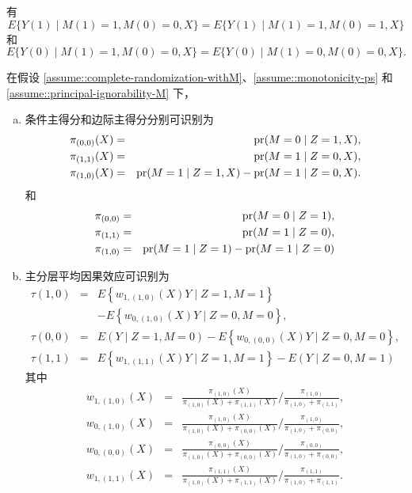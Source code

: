 \begin{assumption}
[主可忽略性]\label{assume::principal-ignorability-M}
有
$$
E\{  Y(1) \mid M(1) = 1, M(0) =0, X \} = E\{  Y(1) \mid M(1) = 1, M(0) =1, X \}
$$
和
$$
E\{  Y(0) \mid M(1) = 1, M(0) =0, X \} = E\{  Y(0) \mid M(1) = 0, M(0) =0, X \}. 
$$
\end{assumption}


\begin{theorem}
\label{thm::identification-PCEs-pscore-general-ding-lu}
在假设 \ref{assume::complete-randomization-withM}、\ref{assume::monotonicity-ps} 和 \ref{assume::principal-ignorability-M} 下， 
\begin{enumerate}
[(a)]
\item
 条件主得分和边际主得分分别可识别为
\begin{eqnarray*}
\pi_{(0,0)}(X) &=& \textup{pr}(M=0\mid Z=1, X),\\
\pi_{(1,1)}(X) &=& \textup{pr}(M=1\mid Z=0, X),\\
\pi_{(1,0)}(X) &=& \textup{pr}(M=1\mid Z=1, X) - \textup{pr}(M=1\mid Z=0, X).
\end{eqnarray*}
和
\begin{eqnarray*}
\pi_{(0,0)} &=& \textup{pr}(M=0\mid Z=1),\\
\pi_{(1,1)} &=& \textup{pr}(M=1\mid Z=0),\\
\pi_{(1,0)} &=& \textup{pr}(M=1\mid Z=1) - \textup{pr}(M=1\mid Z=0)
\end{eqnarray*}
\item
主分层平均因果效应可识别为
\begin{eqnarray*}
\tau(1,0) &=& E\left\{w_{1, (1,0)}(X) Y \mid Z=1, M=1\right\}  \\
&& -E\left\{w_{0, (1,0)}(X) Y \mid Z=0, M=0\right\} , \\
\tau(0,0) &=& E(Y \mid Z=1, M=0)-E\left\{w_{0, (0,0)}( X ) Y \mid Z=0, M=0\right\}, \\
\tau(1,1) &=& E\left\{w_{1,  (1,1)}( X ) Y \mid Z=1, M=1\right\}-E(Y \mid Z=0, M=1)
\end{eqnarray*}
其中
\begin{eqnarray*}
w_{1, (1,0)}(X) &=&\frac{\pi_{(1,0)}(X)}{\pi_{(1,0)}(X)+\pi_{(1,1)}(X)} \Big / \frac{\pi_{(1,0)}}{\pi_{(1,0)}+\pi_{(1,1)}} , \\
w_{0, (1,0)}(X) &=& \frac{\pi_{(1,0)}(X)}{\pi_{(1,0)}(X)+\pi_{(0,0)}(X)} \Big / \frac{\pi_{(1,0)}}{\pi_{(1,0)}+\pi_{(0,0)}} ,  \\
w_{0, (0,0)}(X) &=&\frac{\pi_{(0,0)}(X)}{\pi_{(1,0)}(X)+\pi_{(0,0)}(X)} \Big / \frac{\pi_{(0,0)}}{\pi_{(1,0)}+\pi_{(0,0)}} , \\
w_{1, (1,1)}(X) &=&\frac{\pi_{(1,1)}(X)}{\pi_{(1,0)}(X)+\pi_{(1,1)}(X)} \Big / \frac{\pi_{(1,1)}}{\pi_{(1,0)}+\pi_{(1,1)}} .
\end{eqnarray*}
\end{enumerate}
\end{theorem}



